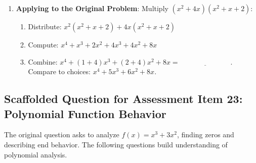 \documentclass[12pt]{article}
\begin{document}
\begin{enumerate}[label=22.\arabic*]
\begin{enumerate}[label=\alph*)]
    \end{enumerate}
    \item \textbf{Applying to the Original Problem}: Multiply \( (x^2 + 4x)(x^2 + x + 2) \):
    \begin{enumerate}[label=\alph*)]
        \item Distribute: \( x^2(x^2 + x + 2) + 4x(x^2 + x + 2) \)
        \item Compute: \( x^4 + x^3 + 2x^2 + 4x^3 + 4x^2 + 8x \)
        \item Combine: \( x^4 + (1 + 4)x^3 + (2 + 4)x^2 + 8x = \underline{\hspace{3cm}} \). \\
        Compare to choices: \( x^4 + 5x^3 + 6x^2 + 8x \).
    \end{enumerate}
\end{enumerate}

\subsection*{Scaffolded Question for Assessment Item 23: Polynomial Function Behavior}
The original question asks to analyze \( f(x) = x^3 + 3x^2 \), finding zeros and describing end behavior. The following questions build understanding of polynomial analysis.
\end{document}
